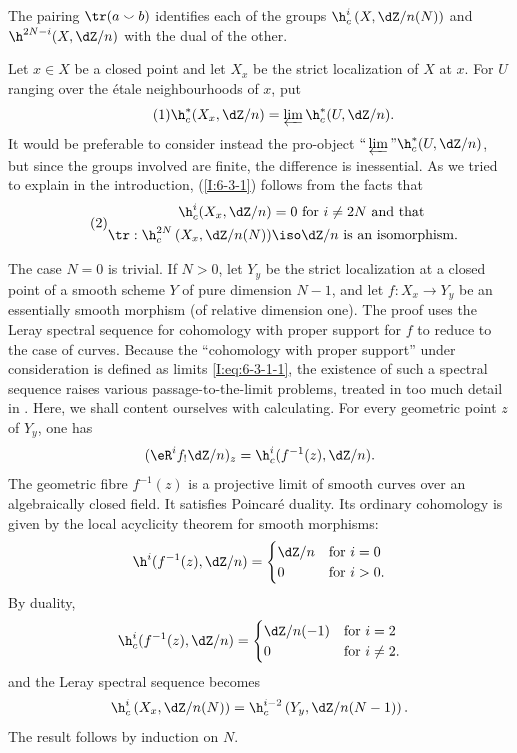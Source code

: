 \begin{theorem}\label{I:6-3-1}
The pairing $\tr(a\smallsmile b)$ identifies each of the groups
$\h_c^i\left(X,\dZ/n(N)\right)$ and $\h^{2N-i}(X,\dZ/n)$ with the dual
of the other.
\end{theorem}

Let $x\in X$ be a closed point and let $X_x$ be the strict localization
of $X$ at $x$. For $U$ ranging over the étale neighbourhoods of $x$,
put
\begin{equation*}\tag{1}\label{I:eq:6-3-1-1}
  \h_c^*(X_x,\dZ/n) = \varprojlim \h_c^*(U,\dZ/n) \text{.}
\end{equation*}
It would be preferable to consider instead the pro-object
$\text{“}\varprojlim\text{”}\h_c^*(U,\dZ/n)$, but since the
groups involved are finite, the difference is inessential. As we tried
to explain in the introduction, (\ref{I:6-3-1}) follows from the facts
that
\begin{equation*}\tag{2}\label{I:eq:6-3-1-2}
\begin{aligned}
  \h_c^i(X_x,\dZ/n) &= 0 \text{ for $i\ne 2N$ and that } \\
  \tr : \h_c^{2 N}\left(X_x,  \dZ/n(N)\right) &\iso \dZ/n \text{ is an isomorphism.}
\end{aligned}
\end{equation*}

The case $N=0$ is trivial. If $N>0$, let $Y_y$ be the strict
localization at a closed point of a smooth scheme $Y$ of pure dimension
$N-1$, and let $f:X_x\to Y_y$ be an essentially smooth morphism (of
relative dimension one). The proof uses the Leray spectral sequence for
cohomology with proper support for $f$ to reduce to the case of curves.
Because the “cohomology with proper support” under consideration is
defined as limits \eqref{I:eq:6-3-1-1}, the existence of such a spectral
sequence raises various passage-to-the-limit problems, treated in too much
detail in . Here, we shall content ourselves with calculating. For every geometric point $z$ of $Y_y$,
one has
\[
  (\eR^if_! \dZ/n)_z = \h_c^i(f^{-1}(z),\dZ/n) \text{.}
\]
The geometric fibre $f^{-1}(z)$ is a projective limit of smooth curves
over an algebraically closed field. It satisfies Poincaré duality. Its
ordinary cohomology is given by the local acyclicity theorem for smooth
morphisms:
\[
  \h^i(f^{-1}(z),\dZ/n)
    = \begin{cases}
        \dZ/n & \text{for $i=0$} \\
        0     & \text{for $i>0$.}
      \end{cases}
\]
By duality,
\[
  \h_c^i(f^{-1}(z),\dZ/n)
    = \begin{cases}
        \dZ/n(-1) & \text{for $i=2$} \\
        0         & \text{for $i\ne 2$.}
      \end{cases}
\]
and the Leray spectral sequence becomes
\[
  \h_c^i\left(X_x,\dZ/n(N)\right) = \h_c^{i-2}\left(Y_y,\dZ/n(N-1)\right) \text{.}
\]
The result follows by induction on $N$.

